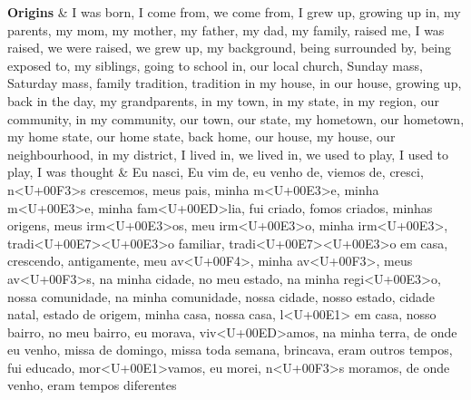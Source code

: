 \documentclass[smallextended]{svjour3}       %
\begin{document}
\begin{landscape}
\begin{longtabu}
\textbf{Origins} & I was born, I come from, we come from, I grew up, growing up in, my parents, my mom, my mother, my father, my dad, my family, raised me, I was raised, we were raised, we grew up, my background, being surrounded by, being exposed to, my siblings, going to school in, our local church, Sunday mass, Saturday mass, family tradition, tradition in my house, in our house, growing up, back in the day, my grandparents, in my town, in my state, in my region, our community, in my community, our town, our state, my hometown, our hometown, my home state, our home state, back home, our house, my house, our neighbourhood, in my district, I lived in, we lived in, we used to play, I used to play, I was thought & Eu nasci, Eu vim de, eu venho de, viemos de, cresci, n<U+00F3>s crescemos, meus pais, minha m<U+00E3>e, minha m<U+00E3>e, minha fam<U+00ED>lia, fui criado, fomos criados, minhas origens, meus irm<U+00E3>os, meu irm<U+00E3>o, minha irm<U+00E3>, tradi<U+00E7><U+00E3>o familiar, tradi<U+00E7><U+00E3>o em casa, crescendo, antigamente, meu av<U+00F4>, minha av<U+00F3>, meus av<U+00F3>s, na minha cidade, no meu estado, na minha regi<U+00E3>o, nossa comunidade, na minha comunidade, nossa cidade, nosso estado, cidade natal, estado de origem, minha casa, nossa casa, l<U+00E1> em casa, nosso bairro, no meu bairro, eu morava, viv<U+00ED>amos, na minha terra, de onde eu venho, missa de domingo, missa toda semana, brincava, eram outros tempos, fui educado, mor<U+00E1>vamos, eu morei, n<U+00F3>s moramos, de onde venho, eram tempos diferentes\\
\addlinespace

\end{longtabu}
\end{landscape}
\end{document}

